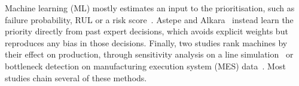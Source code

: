 Machine learning (ML) mostly estimates an input to the prioritisation, such as failure probability, RUL or a risk score~\cite{darko2026,danach2026,dui2025,rios2024,tang2026,wittbrodt2026}. Astepe and Alkara~\cite{astepe2021} instead learn the priority directly from past expert decisions, which avoids explicit weights but reproduces any bias in those decisions. Finally, two studies rank machines by their effect on production, through sensitivity analysis on a line simulation~\cite{yang2021} or bottleneck detection on manufacturing execution system (MES) data~\cite{gopalakrishnan2022}. Most studies chain several of these methods.